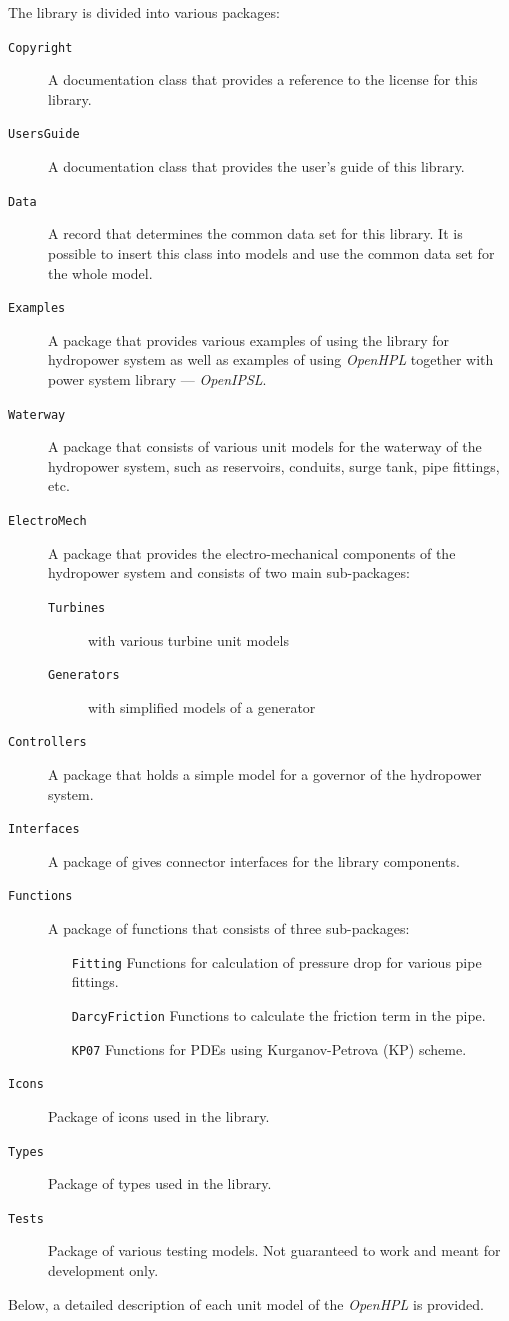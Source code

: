 \documentclass[%
]{USN-PhD}
\begin{document}
The library is divided into various packages:
\begin{description}
\item[\texttt{Copyright}] A documentation class that  provides a reference to the license for this library.
\item[\texttt{UsersGuide}] A documentation class that  provides the user's guide of this library.
\item[\texttt{Data}] A record that determines the common data set for this library. It is possible to insert this class into models and use the common data set for the whole model.
    \item[\texttt{Examples}] A package that provides various examples of using the library for hydropower system as well as examples of using \emph{OpenHPL} together with power system library --- \emph{OpenIPSL}.
    \item[\texttt{Waterway}] A package that consists of various unit models for the waterway of the hydropower system, such as reservoirs, conduits, surge tank, pipe fittings, etc.
    \item[\texttt{ElectroMech}] A package that provides the electro-mechanical components of the hydropower system and consists of two main sub-packages:
      \begin{description}
      \item[\texttt{Turbines}] with various turbine unit models
      \item[\texttt{Generators}] with simplified models of a generator
      \end{description}
    \item[\texttt{Controllers}] A package that holds a simple model for a governor of the hydropower system.
    \item[\texttt{Interfaces}] A package of gives connector interfaces for the library components.
    \item[\texttt{Functions}] A package of functions that consists of three sub-packages:
      \begin{itemize}
      \item[\texttt{Fitting}] Functions for calculation of pressure drop for various pipe fittings.
      \item[\texttt{DarcyFriction}] Functions to calculate the friction term in the pipe.
      \item[\texttt{KP07}] Functions for PDEs using Kurganov-Petrova (KP) scheme.
      \end{itemize}
    \item[\texttt{Icons}] Package of icons used in the library.
    \item[\texttt{Types}] Package of types used in the library.
    \item[\texttt{Tests}] Package of various testing models. Not guaranteed to work and meant for development only.
    \end{description}
Below, a detailed description of each unit model of the \emph{OpenHPL} is provided.
\end{document}
